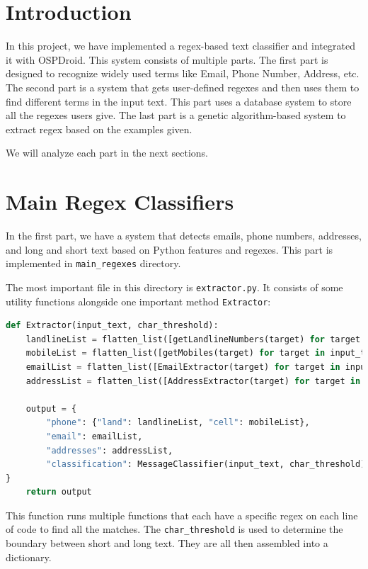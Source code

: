 \documentclass[12pt]{article}
\begin{document}
\section{Introduction}

In this project, we have implemented a regex-based text classifier and integrated it with OSPDroid. This system consists of multiple parts. The first part is designed to recognize widely used terms like Email, Phone Number, Address, etc. The second part is a system that gets user-defined regexes and then uses them to find different terms in the input text. This part uses a database system to store all the regexes users give. The last part is a genetic algorithm-based system to extract regex based on the examples given.

We will analyze each part in the next sections.

\section{Main Regex Classifiers}

In the first part, we have a system that detects emails, phone numbers, addresses, and long and short text based on Python features and regexes. This part is implemented in \verb*|main_regexes| directory.

The most important file in this directory is \verb*|extractor.py|. It consists of some utility functions alongside one important method \verb*|Extractor|:



\begin{lstlisting}[language=python]
def Extractor(input_text, char_threshold):
	landlineList = flatten_list([getLandlineNumbers(target) for target in input_text])
	mobileList = flatten_list([getMobiles(target) for target in input_text])
	emailList = flatten_list([EmailExtractor(target) for target in input_text])
	addressList = flatten_list([AddressExtractor(target) for target in input_text])

	output = {
		"phone": {"land": landlineList, "cell": mobileList},
		"email": emailList,
		"addresses": addressList,
		"classification": MessageClassifier(input_text, char_threshold)
}
	return output
\end{lstlisting}

This function runs multiple functions that each have a specific regex on each line of code to find all the matches. The \verb*|char_threshold| is used to determine the boundary between short and long text.  They are all then assembled into a dictionary.
\end{document}

